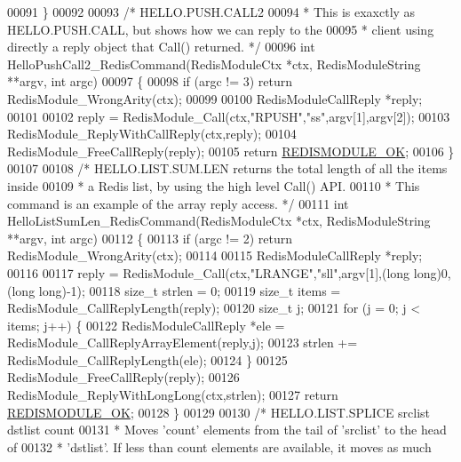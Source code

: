 \begin{DoxyCode}
00091 \}
00092 
00093 \textcolor{comment}{/* HELLO.PUSH.CALL2}
00094 \textcolor{comment}{ * This is exaxctly as HELLO.PUSH.CALL, but shows how we can reply to the}
00095 \textcolor{comment}{ * client using directly a reply object that Call() returned. */}
00096 \textcolor{keywordtype}{int} HelloPushCall2\_RedisCommand(RedisModuleCtx *ctx, RedisModuleString **argv, \textcolor{keywordtype}{int} argc)
00097 \{
00098     \textcolor{keywordflow}{if} (argc != 3) \textcolor{keywordflow}{return} RedisModule\_WrongArity(ctx);
00099 
00100     RedisModuleCallReply *reply;
00101 
00102     reply = RedisModule\_Call(ctx,\textcolor{stringliteral}{"RPUSH"},\textcolor{stringliteral}{"ss"},argv[1],argv[2]);
00103     RedisModule\_ReplyWithCallReply(ctx,reply);
00104     RedisModule\_FreeCallReply(reply);
00105     \textcolor{keywordflow}{return} \hyperlink{redismodule_8h_a1bc5bfd69abcd378ff52c640adc5418d}{REDISMODULE\_OK};
00106 \}
00107 
00108 \textcolor{comment}{/* HELLO.LIST.SUM.LEN returns the total length of all the items inside}
00109 \textcolor{comment}{ * a Redis list, by using the high level Call() API.}
00110 \textcolor{comment}{ * This command is an example of the array reply access. */}
00111 \textcolor{keywordtype}{int} HelloListSumLen\_RedisCommand(RedisModuleCtx *ctx, RedisModuleString **argv, \textcolor{keywordtype}{int} argc)
00112 \{
00113     \textcolor{keywordflow}{if} (argc != 2) \textcolor{keywordflow}{return} RedisModule\_WrongArity(ctx);
00114 
00115     RedisModuleCallReply *reply;
00116 
00117     reply = RedisModule\_Call(ctx,\textcolor{stringliteral}{"LRANGE"},\textcolor{stringliteral}{"sll"},argv[1],(\textcolor{keywordtype}{long} \textcolor{keywordtype}{long})0,(\textcolor{keywordtype}{long} \textcolor{keywordtype}{long})-1);
00118     size\_t strlen = 0;
00119     size\_t items = RedisModule\_CallReplyLength(reply);
00120     size\_t j;
00121     \textcolor{keywordflow}{for} (j = 0; j < items; j++) \{
00122         RedisModuleCallReply *ele = RedisModule\_CallReplyArrayElement(reply,j);
00123         strlen += RedisModule\_CallReplyLength(ele);
00124     \}
00125     RedisModule\_FreeCallReply(reply);
00126     RedisModule\_ReplyWithLongLong(ctx,strlen);
00127     \textcolor{keywordflow}{return} \hyperlink{redismodule_8h_a1bc5bfd69abcd378ff52c640adc5418d}{REDISMODULE\_OK};
00128 \}
00129 
00130 \textcolor{comment}{/* HELLO.LIST.SPLICE srclist dstlist count}
00131 \textcolor{comment}{ * Moves 'count' elements from the tail of 'srclist' to the head of}
00132 \textcolor{comment}{ * 'dstlist'. If less than count elements are available, it moves as much}

\end{DoxyCode}
